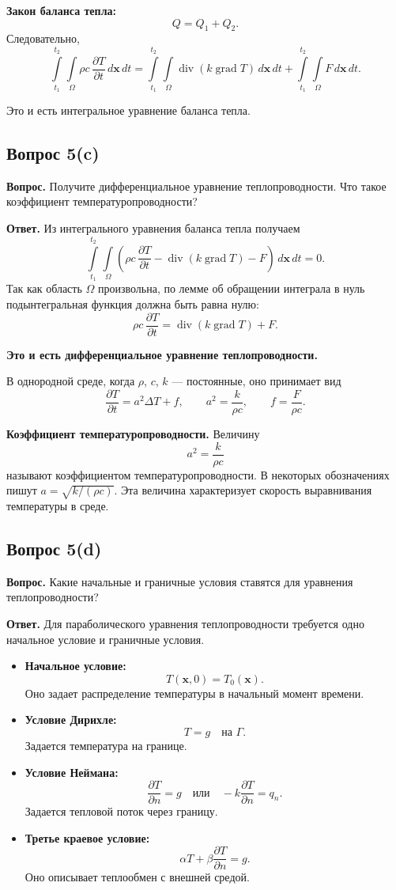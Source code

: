 \documentclass[a4paper,12pt]{article}
\newcommand{\grad}{\operatorname{grad}}
\newcommand{\diver}{\operatorname{div}}
\newcommand{\Question}[2]{\subsection*{Вопрос #1}\textbf{Вопрос.} #2}
\newcommand{\Answer}{\textbf{Ответ.}}
\begin{document}
\textbf{Закон баланса тепла:}
\[
Q=Q_1+Q_2.
\]
Следовательно,
\[
\int\limits_{t_1}^{t_2}\!\!\int\limits_{\Omega}
\rho c\,\frac{\partial T}{\partial t}\,d\mathbf{x}\,dt
=
\int\limits_{t_1}^{t_2}\!\!\int\limits_{\Omega}
\diver(k\grad T)\,d\mathbf{x}\,dt
+
\int\limits_{t_1}^{t_2}\!\!\int\limits_{\Omega}
F\,d\mathbf{x}\,dt.
\]

Это и есть интегральное уравнение баланса тепла.

\Question{5(c)}{Получите дифференциальное уравнение теплопроводности. Что такое коэффициент температуропроводности?}

\Answer
Из интегрального уравнения баланса тепла получаем
\[
\int\limits_{t_1}^{t_2}\!\!\int\limits_{\Omega}
\left(
\rho c\,\frac{\partial T}{\partial t}
-\diver(k\grad T)-F
\right)\,d\mathbf{x}\,dt=0.
\]
Так как область $\Omega$ произвольна, по лемме об обращении интеграла в нуль подынтегральная функция должна быть равна нулю:
\[
\rho c\,\frac{\partial T}{\partial t}=\diver(k\grad T)+F.
\]

\textbf{Это и есть дифференциальное уравнение теплопроводности.}

В однородной среде, когда $\rho$, $c$, $k$ --- постоянные, оно принимает вид
\[
\frac{\partial T}{\partial t}=a^2\Delta T+f,
\qquad
a^2=\frac{k}{\rho c},
\qquad
f=\frac{F}{\rho c}.
\]

\textbf{Коэффициент температуропроводности.} Величину
\[
a^2=\frac{k}{\rho c}
\]
называют коэффициентом температуропроводности. В некоторых обозначениях пишут $a=\sqrt{k/(\rho c)}$. Эта величина характеризует скорость выравнивания температуры в среде.

\Question{5(d)}{Какие начальные и граничные условия ставятся для уравнения теплопроводности?}

\Answer
Для параболического уравнения теплопроводности требуется одно начальное условие и граничные условия.

\begin{itemize}
  \item \textbf{Начальное условие:}
  \[
  T(\mathbf{x},0)=T_0(\mathbf{x}).
  \]
  Оно задает распределение температуры в начальный момент времени.

  \item \textbf{Условие Дирихле:}
  \[
  T=g \quad \text{на } \Gamma.
  \]
  Задается температура на границе.

  \item \textbf{Условие Неймана:}
  \[
  \frac{\partial T}{\partial n}=g
  \quad \text{или} \quad
  -k\frac{\partial T}{\partial n}=q_n.
  \]
  Задается тепловой поток через границу.

  \item \textbf{Третье краевое условие:}
  \[
  \alpha T+\beta\frac{\partial T}{\partial n}=g.
  \]
  Оно описывает теплообмен с внешней средой.
\end{itemize}
\end{document}
